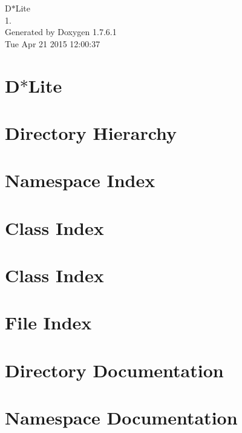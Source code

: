 \documentclass[a4paper]{book}
\begin{document}
\begin{titlepage}
\vspace*{7cm}
\begin{center}
{\Large \-D$\ast$\-Lite \\[1ex]\large 1. }\\
\vspace*{1cm}
{\large \-Generated by Doxygen 1.7.6.1}\\
\vspace*{0.5cm}
{\small Tue Apr 21 2015 12:00:37}\\
\end{center}
\end{titlepage}
\clearemptydoublepage
{}
\tableofcontents
\clearemptydoublepage
{}
\chapter{\-D$\ast$\-Lite}
\label{index}
\chapter{\-Directory \-Hierarchy}

\chapter{\-Namespace \-Index}

\chapter{\-Class \-Index}

\chapter{\-Class \-Index}

\chapter{\-File \-Index}

\chapter{\-Directory \-Documentation}





\chapter{\-Namespace \-Documentation}

\end{document}
